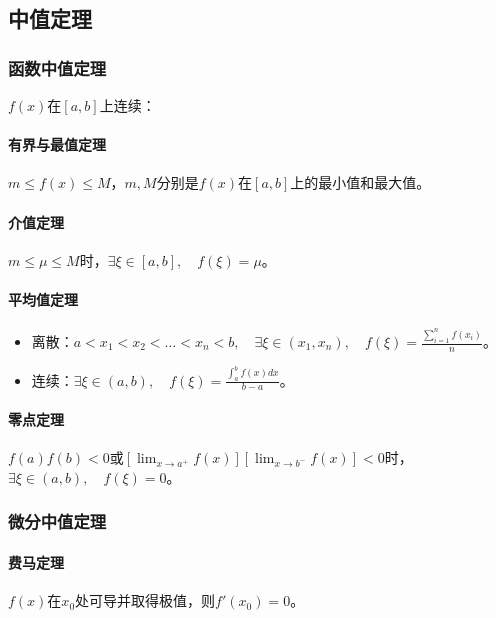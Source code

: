 \documentclass[
12pt, %
a4paper, 
oneside, %
]{scrartcl}
\begin{document}
\subsection[中值定理]{中值定理}
\subsubsection[函数中值定理]{函数中值定理}
$ f(x) $在$ [a, b] $上连续：
\paragraph{有界与最值定理}
$ m \leq f(x) \leq M $，$ m, M $分别是$ f(x) $在$ [a, b] $上的最小值和最大值。
\paragraph{介值定理}
$ m \leq \mu \leq M $时，$ \exists \xi \in [a, b], \quad f(\xi) = \mu $。
\paragraph{平均值定理}
\begin{itemize}
\item 离散：$ a < x_1 < x_2 < \dots < x_n < b, \quad \exists \xi \in (x_1, x_n), \quad f(\xi) = \frac{\sum_{i = 1}^n f(x_i)}{n} $。
\item 连续：$ \exists \xi \in (a, b), \quad f(\xi) = \frac{\int_{a}^{b} f(x) d x }{b - a} $。
\end{itemize}
\paragraph{零点定理}
$ f(a)f(b) < 0 $或$ [\lim_{x \to a^+} f(x)][\lim_{x \to b^-} f(x)] < 0 $时，$ \exists \xi \in (a, b), \quad f(\xi) = 0 $。
\subsubsection[微分中值定理]{微分中值定理}
\paragraph{费马定理}
$ f(x) $在$ x_0 $处可导并取得极值，则$ f'(x_0) = 0 $。
\end{document}
